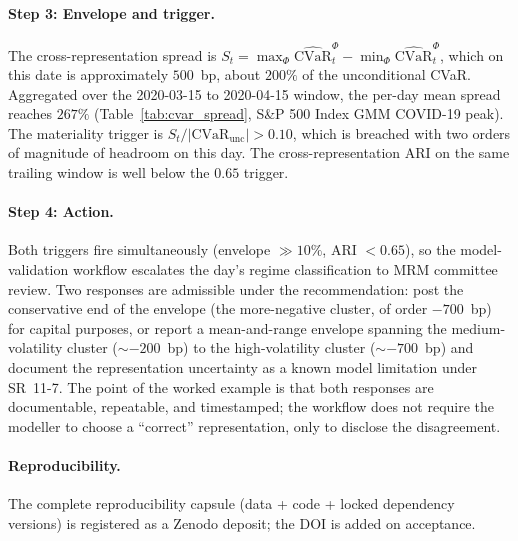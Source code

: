 \documentclass[preprint,12pt,authoryear]{elsarticle}
\newcommand{\SPX}{S\&P 500 Index}
\begin{document}
\paragraph{Step 3: Envelope and trigger.}
The cross-representation spread is $S_t = \max_\Phi \widehat{\mathrm{CVaR}}_t^\Phi - \min_\Phi \widehat{\mathrm{CVaR}}_t^\Phi$, which on this date is approximately $500$~bp, about $200\%$ of the unconditional CVaR. Aggregated over the 2020-03-15 to 2020-04-15 window, the per-day mean spread reaches $267\%$ (Table~\ref{tab:cvar_spread}, \SPX{} GMM COVID-19 peak). The materiality trigger is $S_t / |\mathrm{CVaR}_\text{unc}| > 0.10$, which is breached with two orders of magnitude of headroom on this day. The cross-representation ARI on the same trailing window is well below the $0.65$ trigger.

\paragraph{Step 4: Action.}
Both triggers fire simultaneously (envelope $\gg 10\%$, ARI $< 0.65$), so the model-validation workflow escalates the day's regime classification to MRM committee review. Two responses are admissible under the recommendation: post the conservative end of the envelope (the more-negative cluster, of order $-700$~bp) for capital purposes, or report a mean-and-range envelope spanning the medium-volatility cluster ($\sim$$-200$~bp) to the high-volatility cluster ($\sim$$-700$~bp) and document the representation uncertainty as a known model limitation under SR~11-7. The point of the worked example is that both responses are documentable, repeatable, and timestamped; the workflow does not require the modeller to choose a ``correct'' representation, only to disclose the disagreement.

\paragraph{Reproducibility.}
The complete reproducibility capsule (data + code + locked dependency versions) is registered as a Zenodo deposit; the DOI is added on acceptance.


\end{document}
